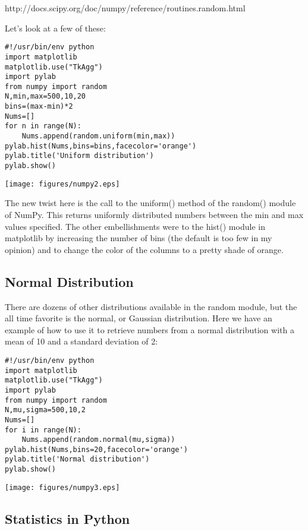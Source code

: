 {http://docs.scipy.org/doc/numpy/reference/routines.random.html

Let's look at a few of these: 


{\singlespacing \color{blue} \begin{verbatim}
#!/usr/bin/env python
import matplotlib
matplotlib.use("TkAgg")
import pylab
from numpy import random
N,min,max=500,10,20
bins=(max-min)*2
Nums=[]
for n in range(N):
    Nums.append(random.uniform(min,max))
pylab.hist(Nums,bins=bins,facecolor='orange')
pylab.title('Uniform distribution')
pylab.show()
\end{verbatim}}

\texttt{[image: figures/numpy2.eps]}

\noindent The new twist here is the call to the {\color{blue}uniform()} method of the {\color{blue}random()} module of {\color{blue}NumPy}.  This returns uniformly distributed numbers between the min and max values specified.  The other embellishments were to the {\color{blue}hist()} module in {\color{blue}matplotlib} by increasing the number of bins (the default is too few in my opinion) and to change the color of the columns to a pretty shade of orange.  


\subsection{Normal Distribution}

There are dozens of other distributions available in the {\color{blue}random} module, but the all time favorite is the normal, or Gaussian distribution.  Here we have an example of how to use it to retrieve numbers from a normal distribution  with a mean of 10 and a standard deviation of 2:


{\singlespacing \color{blue} \begin{verbatim}
#!/usr/bin/env python
import matplotlib
matplotlib.use("TkAgg")
import pylab
from numpy import random
N,mu,sigma=500,10,2
Nums=[]
for i in range(N):
    Nums.append(random.normal(mu,sigma))
pylab.hist(Nums,bins=20,facecolor='orange')
pylab.title('Normal distribution')
pylab.show()
\end{verbatim}}

\texttt{[image: figures/numpy3.eps]}

\subsection{Statistics in Python}

}
